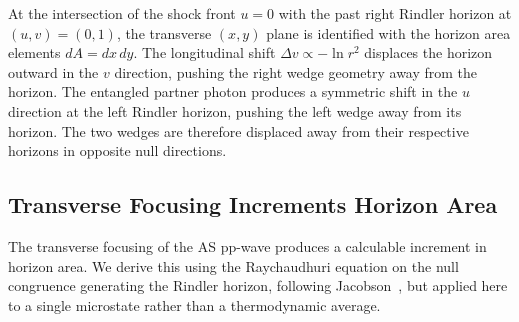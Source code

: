 \documentclass[12pt,a4paper]{article}
\begin{document}
At the intersection of the shock front $u=0$ with the past right 
Rindler horizon at $(u,v)=(0,1)$, the transverse $(x,y)$ plane 
is identified with the horizon area elements $dA = dx\,dy$. The 
longitudinal shift $\Delta v \propto -\ln r^2$ displaces the 
horizon outward in the $v$ direction, pushing the right wedge 
geometry away from the horizon. The entangled partner photon 
produces a symmetric shift in the $u$ direction at the left 
Rindler horizon, pushing the left wedge away from its horizon. 
The two wedges are therefore displaced away from their respective 
horizons in opposite null directions.

% 

\subsection{Transverse Focusing Increments Horizon Area}
\label{sec:deltaA}

The transverse focusing of the AS pp-wave produces a calculable 
increment in horizon area. We derive this using the Raychaudhuri 
equation on the null congruence generating the Rindler horizon, 
following Jacobson~\cite{jacobson1995thermodynamics}, but applied 
here to a single microstate rather than a thermodynamic average.
\end{document}
